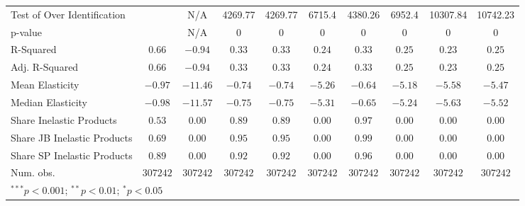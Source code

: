 \begin{tabular}{l c c c c c c c c c}
Test of Over Identification &               & N/A           & 4269.77       & 4269.77       & 6715.4        & 4380.26       & 6952.4        & 10307.84      & 10742.23      \\
p-value                     &               & N/A           & 0             & 0             & 0             & 0             & 0             & 0             & 0             \\
R-Squared                   & $0.66$        & $-0.94$       & $0.33$        & $0.33$        & $0.24$        & $0.33$        & $0.25$        & $0.23$        & $0.25$        \\
Adj. R-Squared              & $0.66$        & $-0.94$       & $0.33$        & $0.33$        & $0.24$        & $0.33$        & $0.25$        & $0.23$        & $0.25$        \\
Mean Elasticity             & $-0.97$       & $-11.46$      & $-0.74$       & $-0.74$       & $-5.26$       & $-0.64$       & $-5.18$       & $-5.58$       & $-5.47$       \\
Median Elasticity           & $-0.98$       & $-11.57$      & $-0.75$       & $-0.75$       & $-5.31$       & $-0.65$       & $-5.24$       & $-5.63$       & $-5.52$       \\
Share Inelastic Products    & $0.53$        & $0.00$        & $0.89$        & $0.89$        & $0.00$        & $0.97$        & $0.00$        & $0.00$        & $0.00$        \\
Share JB Inelastic Products & $0.69$        & $0.00$        & $0.95$        & $0.95$        & $0.00$        & $0.99$        & $0.00$        & $0.00$        & $0.00$        \\
Share SP Inelastic Products & $0.89$        & $0.00$        & $0.92$        & $0.92$        & $0.00$        & $0.96$        & $0.00$        & $0.00$        & $0.00$        \\
Num. obs.                   & $307242$      & $307242$      & $307242$      & $307242$      & $307242$      & $307242$      & $307242$      & $307242$      & $307242$      \\
\bottomrule
\multicolumn{10}{l}{\scriptsize{$^{***}p<0.001$; $^{**}p<0.01$; $^{*}p<0.05$}}
\end{tabular}
